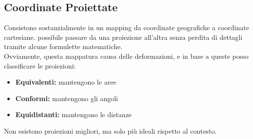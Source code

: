 \documentclass[a4paper,12pt]{article}
\begin{document}
\subsection{Coordinate Proiettate}
Consistono sostanzialmente in un mapping da coordinate geografiche a coordinate cartesiane. \E possibile passare da una proiezione all'altra senza perdita di dettagli tramite alcune formulette matematiche.\\
Ovviamente, questa mappatura causa delle deformazioni, e in base a queste posso classificare le proiezioni:
\begin{itemize}
\item \textbf{Equivalenti:} mantengono le aree
\item \textbf{Conformi:} mantengono gli angoli
\item \textbf{Equidistanti: } mantengono le distanze
\end{itemize}
Non esistono proiezioni migliori, ma solo più ideali rispetto al contesto.



\end{document}
